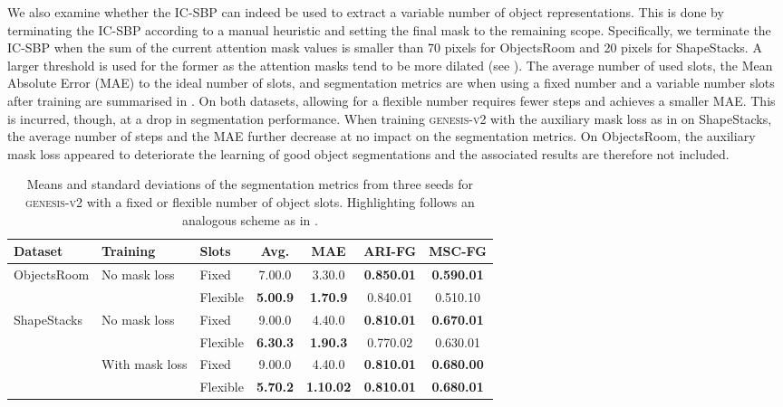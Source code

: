 \documentclass{article}
\begin{document}
We also examine whether the IC-SBP can indeed be used to extract a variable number of object representations.
This is done by terminating the IC-SBP according to a manual heuristic and setting the final mask to the remaining scope.
Specifically, we terminate the IC-SBP when the sum of the current attention mask values is smaller than 70 pixels for ObjectsRoom and 20 pixels for ShapeStacks.
A larger threshold is used for the former as the attention masks tend to be more dilated (see ).
The average number of used slots, the Mean Absolute Error (MAE) to the ideal number of slots, and segmentation metrics are when using a fixed number and a variable number slots after training are summarised in .
On both datasets, allowing for a flexible number requires fewer steps and achieves a smaller MAE.
This is incurred, though, at a drop in segmentation performance.
When training \textsc{genesis-v2} with the auxiliary mask loss as in  on ShapeStacks, the average number of steps and the MAE further decrease at no impact on the segmentation metrics.
On ObjectsRoom, the auxiliary mask loss appeared to deteriorate the learning of good object segmentations and the associated results are therefore not included.

\begin{table}
	\centering
	\caption{Means and standard deviations of the segmentation metrics from three seeds for \textsc{genesis-v2} with a fixed or flexible number of object slots. Highlighting follows an analogous scheme as in .}
	\begin{tabular}{lllcccc}
		\toprule
		Dataset & Training & Slots & Avg.   & MAE  & ARI-FG  & MSC-FG  \\
		\midrule
		ObjectsRoom & No mask loss & Fixed    & 7.00.0 & 3.30.0 & \textbf{0.850.01} & \textbf{0.590.01} \\
		&                          & Flexible & \textbf{5.00.9} & \textbf{1.70.9} & 0.840.01 & 0.510.10 \\
		\midrule
		\midrule
		ShapeStacks & No mask loss & Fixed    & 9.00.0 & 4.40.0 & \textbf{0.810.01} & \textbf{0.670.01} \\
        &                          & Flexible & \textbf{6.30.3} & \textbf{1.90.3} & 0.770.02 & 0.630.01 \\
        \cmidrule{2-7}
		            & With mask loss & Fixed & 9.00.0 & 4.40.0 & \textbf{0.810.01} & \textbf{0.680.00} \\
		&                            & Flexible & \textbf{5.70.2} & \textbf{1.10.02} & \textbf{0.810.01} & \textbf{0.680.01} \\
		\bottomrule
	\end{tabular}
	\label{tab:gpp:dynamic_k}
\end{table}
\end{document}
